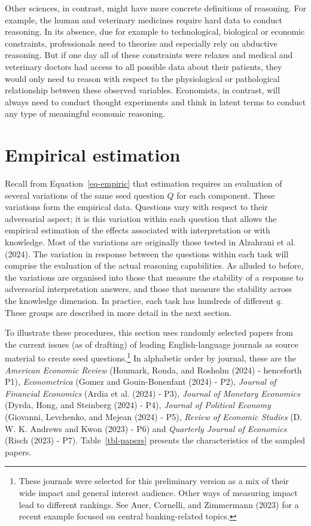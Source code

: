 \documentclass[
]{article}
\begin{document}
Other sciences, in contrast, might have more concrete definitions of
reasoning. For example, the human and veterinary medicines require hard
data to conduct reasoning. In its absence, due for example to
technological, biological or economic constraints, professionals need to
theorise and especially rely on abductive reasoning. But if one day all
of these constraints were relaxes and medical and veterinary doctors had
access to all possible data about their patients, they would only need
to reason with respect to the physiological or pathological relationship
between these observed variables. Economists, in contrast, will always
need to conduct thought experiments and think in latent terms to conduct
any type of meaningful economic reasoning.

\section{Empirical estimation}\label{sec-variation}

Recall from Equation~\ref{eq-empiric} that estimation requires an
evaluation of several variations of the same seed question \(Q\) for
each component. These variations form the empirical data. Questions vary
with respect to their adversarial aspect; it is this variation within
each question that allows the empirical estimation of the effects
associated with interpretation or with knowledge. Most of the variations
are originally those tested in Alzahrani et al. (2024). The variation in
response between the questions within each task will comprise the
evaluation of the actual reasoning capabilities. As alluded to before,
the variations are organised into those that measure the stability of a
response to adversarial interpretation answers, and those that measure
the stability across the knowledge dimension. In practice, each task has
hundreds of different \(q\). These groups are described in more detail
in the next section.

To illustrate these procedures, this section uses randomly selected
papers from the current issues (as of drafting) of leading
English-language journals as source material to create seed
questions.\footnote{These journals were selected for this preliminary
  version as a mix of their wide impact and general interest audience.
  Other ways of measuring impact lead to different rankings. See Auer,
  Cornelli, and Zimmermann (2023) for a recent example focused on
  central banking-related topics.} In alphabetic order by journal, these
are the \emph{American Economic Review} (Houmark, Ronda, and Rosholm
(2024) - henceforth P1), \emph{Econometrica} (Gomez and Gouin-Bonenfant
(2024) - P2), \emph{Journal of Financial Economics} (Ardia et al. (2024)
- P3), \emph{Journal of Monetary Economics} (Dyrda, Hong, and Steinberg
(2024) - P4), \emph{Journal of Political Economy} (Giovanni, Levchenko,
and Mejean (2024) - P5), \emph{Review of Economic Studies} (D. W. K.
Andrews and Kwon (2023) - P6) and \emph{Quarterly Journal of Economics}
(Risch (2023) - P7). Table~\ref{tbl-papers} presents the characteristics
of the sampled papers.
\end{document}
